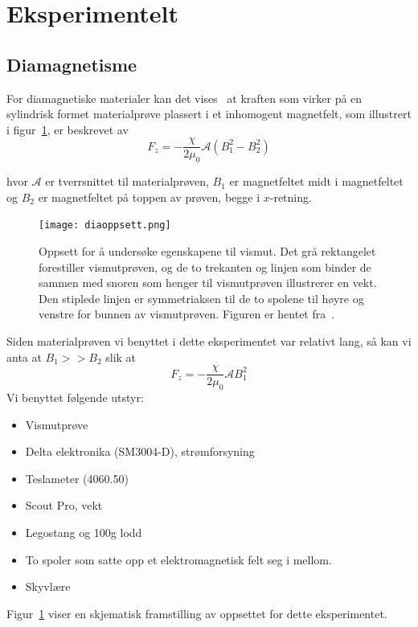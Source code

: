 \documentclass[a4paper,11pt, twocolumn]{article}
\begin{document}
\section{Eksperimentelt}
\subsection{Diamagnetisme}
For diamagnetiske materialer kan det vises~\cite{oppgavesett} at kraften som virker på en sylindrisk formet materialprøve plassert i et inhomogent magnetfelt, som illustrert i figur~\ref{fig:diaoppsett}, er beskrevet av 
\begin{equation}
	F_z = -\frac{\chi}{2\mu_0}\mathcal{A}(B_1^2-B_2^2)
	\label{eq:dia}
\end{equation}

hvor $\mathcal{A}$ er tverrsnittet til materialprøven, $B_1$ er magnetfeltet midt i magnetfeltet og $B_2$ er magnetfeltet på toppen av prøven, begge i $x$-retning.

\begin{figure}[!ht]
	\centering
	\texttt{[image: diaoppsett.png]}
	\caption{Oppsett for å undersøke egenskapene til vismut. Det grå rektangelet forestiller vismutprøven, og de to trekanten og linjen som binder de sammen med snoren som henger til vismutprøven illustrerer en vekt. Den stiplede linjen er symmetriaksen til de to spolene til høyre og venstre for bunnen av vismutprøven. Figuren er hentet fra~\cite{fys1120}.}
	\label{fig:diaoppsett}
\end{figure}
Siden materialprøven vi benyttet i dette eksperimentet var relativt lang, så kan vi anta at $B_1>>B_2$ slik at 
\begin{equation}
	F_z = -\frac{\chi}{2\mu_0}\mathcal{A}B_1^2
	\label{eq:diaForenklet}
\end{equation}
Vi benyttet følgende utstyr:
\begin{itemize}
	\item Vismutprøve
	\item Delta elektronika (SM3004-D), strømforsyning
	\item Teslameter (4060.50)
	\item Scout Pro, vekt
	\item Legostang og 100g lodd 
	\item To spoler som satte opp et elektromagnetisk felt seg i mellom.
	\item Skyvlære
\end{itemize}
Figur~\ref{fig:diaoppsett} viser en skjematisk framstilling av oppsettet for dette eksperimentet.
\end{document}
